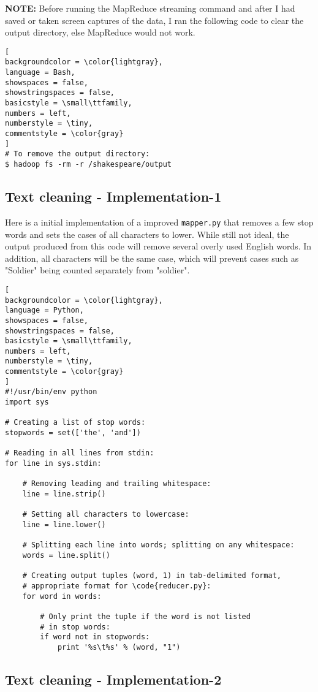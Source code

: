 \documentclass[]{article}
\newcommand{\code}[1]{\colorbox{light-gray}{\texttt{#1}}}
\begin{document}
\textbf{NOTE:} Before running the MapReduce streaming command and after I had saved or taken screen captures of the data, I ran the following code to clear the output directory, else MapReduce would not work.  

\begin{lstlisting}[
backgroundcolor = \color{lightgray},
language = Bash,
showspaces = false,
showstringspaces = false,
basicstyle = \small\ttfamily,
numbers = left,
numberstyle = \tiny,
commentstyle = \color{gray}
]
# To remove the output directory:
$ hadoop fs -rm -r /shakespeare/output
\end{lstlisting}
\subsection{Text cleaning - Implementation-1}

Here is a initial implementation of a improved \code{mapper.py} that removes a few stop words and sets the cases of all characters to lower.  While still not ideal, the output produced from this code will remove several overly used English words.  In addition, all characters will be the same case, which will prevent cases such as "Soldier" being counted separately from "soldier".  

\begin{lstlisting}[
backgroundcolor = \color{lightgray},
language = Python,
showspaces = false,
showstringspaces = false,
basicstyle = \small\ttfamily,
numbers = left,
numberstyle = \tiny,
commentstyle = \color{gray}
]
#!/usr/bin/env python
import sys

# Creating a list of stop words:
stopwords = set(['the', 'and']) 

# Reading in all lines from stdin:
for line in sys.stdin:

	# Removing leading and trailing whitespace:
	line = line.strip()

	# Setting all characters to lowercase:
	line = line.lower()

	# Splitting each line into words; splitting on any whitespace:
	words = line.split()

	# Creating output tuples (word, 1) in tab-delimited format, 
	# appropriate format for \code{reducer.py}:
	for word in words:

		# Only print the tuple if the word is not listed
		# in stop words:
		if word not in stopwords:
			print '%s\t%s' % (word, "1")
\end{lstlisting}
\subsection{Text cleaning - Implementation-2}
\end{document}
